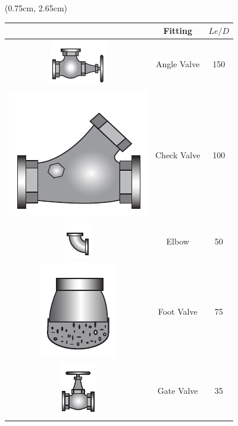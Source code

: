 \documentclass[9pt,xcolor={svgnames, x11names},mathpazo, professionalfonts]{beamer}
\begin{document}
\begin{frame}
	\begin{textblock*}{.35\textwidth}(0.75cm, 2.65cm)
		\centering
		\footnotesize
		\begin{tabular}{ccc}
			\toprule
			                                                                  & Fitting     & $Le/D$ \\
			\midrule
			\includegraphics[scale=0.35]{../../figs/08HWEquivPipe/anglevalve} & Angle Valve & 150    \\
			\midrule
			\includegraphics[scale=0.1]{../../figs/08HWEquivPipe/checkvalve}  & Check Valve & 100    \\
			\midrule
			\includegraphics[scale=0.5]{../../figs/08HWEquivPipe/elbow}       & Elbow       & 50     \\
			\midrule
			\includegraphics[scale=0.2]{../../figs/08HWEquivPipe/footvalve}   & Foot Valve  & 75     \\
			\midrule
			\includegraphics[scale=0.35]{../../figs/08HWEquivPipe/gatevalve}  & Gate Valve  & 35     \\
			\bottomrule
		\end{tabular}
	\end{textblock*}
	

\end{frame}
\end{document}
